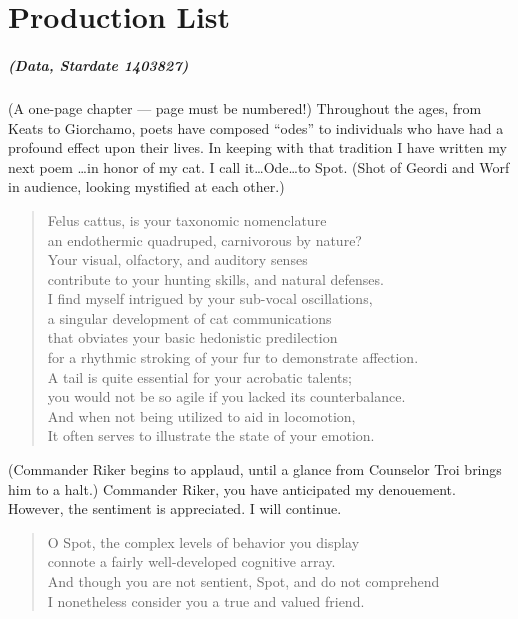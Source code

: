 \chapter{Production List}	\OnePageChapter         %
\label{appendix:ProductionList}
\noindent\paragraph{(Data, Stardate 1403827)}
(A one-page chapter --- page must be numbered!)
Throughout the ages, from Keats to Giorchamo, poets have
composed ``odes'' to individuals who have had a profound effect
upon their lives.  In keeping with that tradition
I have written my next poem \ldots in honor of my cat.
I call it\ldots{}Ode\ldots{}to Spot.
(Shot of Geordi and Worf in audience,
looking mystified at each other.)


\begin{quotation}
\noindent Felus cattus, is your taxonomic nomenclature \\
an endothermic quadruped, carnivorous by nature? \\
Your visual, olfactory, and auditory senses \\
contribute to your hunting skills, and natural defenses. \\
I find myself intrigued by your sub-vocal oscillations, \\
a singular development of cat communications \\
that obviates your basic hedonistic predilection \\
for a rhythmic stroking of your fur to demonstrate affection. \\
A tail is quite essential for your acrobatic talents; \\
you would not be so agile if you lacked its counterbalance. \\
And when not being utilized to aid in locomotion, \\
It often serves to illustrate the state of your emotion.
\end{quotation}


\noindent(Commander Riker begins to applaud, until a
glance from Counselor Troi brings him to a halt.)
Commander Riker, you have anticipated my denouement.
However, the sentiment is appreciated.  I will continue.


\begin{quotation}
\noindent O Spot, the complex levels of behavior you display \\
connote a fairly well-developed cognitive array. \\
And though you are not sentient, Spot, and do not comprehend \\
I nonetheless consider you a true and valued friend.
\end{quotation}
